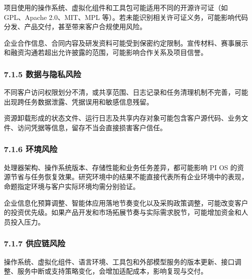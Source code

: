 项目使用的操作系统、虚拟化组件和工具包可能适用不同的开源许可证（如 GPL、Apache 2.0、MIT、MPL 等）。若未能识别相关许可证义务，可能影响代码分发、产品交付，甚至带来客户合规使用风险。


企业合作信息、合同内容及研发资料可能受到保密约定限制。宣传材料、赛事展示和融资沟通若超出允许披露的范围，可能影响合作关系及项目信誉。

\subsubsection{7.1.5 数据与隐私风险}\label{ux6570ux636eux4e0eux9690ux79c1ux98ceux9669}


不同客户访问权限划分不清，或共享范围、日志记录和任务清理机制不完善，可能出现跨任务数据泄露、凭据误用和敏感信息残留。


资源卸载形成的状态文件、运行日志及共享内存对象可能包含客户源代码、业务文件、访问凭据等信息，留存不当会直接损害客户信任。

\subsubsection{7.1.6 环境风险}\label{ux73afux5883ux98ceux9669}


处理器架构、操作系统版本、存储性能和业务任务差异，都可能影响 PI OS 的资源节省与任务恢复效果。研究环境中的结果不能直接代表所有企业环境中的表现，命题指定环境与客户实际环境均需分别验证。


企业信息化预算调整、智能体应用落地节奏变化以及采购政策调整，可能改变客户的投资优先级。如果产品开发和市场拓展节奏与实际需求脱节，可能增加资金和人员投入压力。

\subsubsection{7.1.7 供应链风险}\label{ux4f9bux5e94ux94feux98ceux9669}


操作系统、虚拟化组件、语言环境、工具包和外部模型服务的版本更新、接口调整、服务中断或支持策略变化，会增加适配成本，影响复现与交付。

